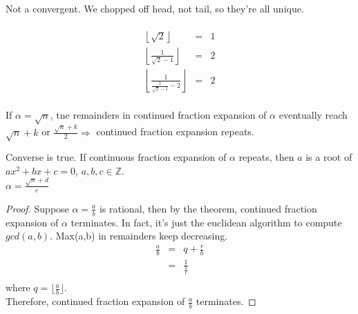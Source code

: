     Not a convergent. We chopped off head, not tail, so they're all unique.\\\\
    \begin{eqnarray*}
      \left\lfloor\sqrt{2} \right\rfloor &= & 1 \\
      \left\lfloor\frac{1}{\sqrt{2} - 1} \right\rfloor &= & 2 \\
      \left\lfloor\frac{1}{\frac{1}{\sqrt{2} - 1} - 2} \right\rfloor &= & 2 \\
    \end{eqnarray*}
    \begin{theorem}
      If $\alpha  = \sqrt{n}$, tne remainders in continued fraction expansion
      of $\alpha$ eventually reach $\sqrt{n} + k$ or $\frac{\sqrt{n} + k}{2}
      \Rightarrow$ continued fraction expansion repeats.
    \end{theorem}
    \begin{theorem}
      Converse is true. If continuous fraction expansion of $\alpha$ repeats,
      then $a$ is a root of $ax^2 + bx + c = 0$, $a,b,c \in \mathbb{Z}$.\\
      $\alpha = \frac{\sqrt{n} + d}{e}$
    \end{theorem}
    \begin{proof}
      Suppose $\alpha = \frac{a}{b}$ is rational, then by the theorem,
      continued fraction expansion of $\alpha$ terminates. In fact, it's
      just the euclidean algorithm to compute $gcd(a,b)$. Max(a,b) in 
      remainders keep decreasing.\\
      \begin{eqnarray*}
        \frac{a}{b} & = & q + \frac{r}{b} \\
          & = & \frac{1}{\frac{b}{r}} \\
      \end{eqnarray*}
      where $q = \lfloor\frac{a}{b}\rfloor$.\\
      Therefore, continued fraction expansion of $\frac{a}{b}$ terminates.
    \end{proof}
